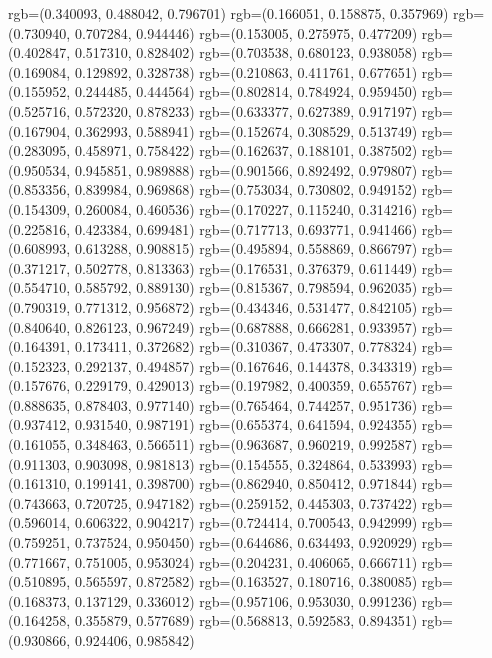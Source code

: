 {{{					rgb=(0.340093, 0.488042, 0.796701)
					rgb=(0.166051, 0.158875, 0.357969)
					rgb=(0.730940, 0.707284, 0.944446)
					rgb=(0.153005, 0.275975, 0.477209)
					rgb=(0.402847, 0.517310, 0.828402)
					rgb=(0.703538, 0.680123, 0.938058)
					rgb=(0.169084, 0.129892, 0.328738)
					rgb=(0.210863, 0.411761, 0.677651)
					rgb=(0.155952, 0.244485, 0.444564)
					rgb=(0.802814, 0.784924, 0.959450)
					rgb=(0.525716, 0.572320, 0.878233)
					rgb=(0.633377, 0.627389, 0.917197)
					rgb=(0.167904, 0.362993, 0.588941)
					rgb=(0.152674, 0.308529, 0.513749)
					rgb=(0.283095, 0.458971, 0.758422)
					rgb=(0.162637, 0.188101, 0.387502)
					rgb=(0.950534, 0.945851, 0.989888)
					rgb=(0.901566, 0.892492, 0.979807)
					rgb=(0.853356, 0.839984, 0.969868)
					rgb=(0.753034, 0.730802, 0.949152)
					rgb=(0.154309, 0.260084, 0.460536)
					rgb=(0.170227, 0.115240, 0.314216)
					rgb=(0.225816, 0.423384, 0.699481)
					rgb=(0.717713, 0.693771, 0.941466)
					rgb=(0.608993, 0.613288, 0.908815)
					rgb=(0.495894, 0.558869, 0.866797)
					rgb=(0.371217, 0.502778, 0.813363)
					rgb=(0.176531, 0.376379, 0.611449)
					rgb=(0.554710, 0.585792, 0.889130)
					rgb=(0.815367, 0.798594, 0.962035)
					rgb=(0.790319, 0.771312, 0.956872)
					rgb=(0.434346, 0.531477, 0.842105)
					rgb=(0.840640, 0.826123, 0.967249)
					rgb=(0.687888, 0.666281, 0.933957)
					rgb=(0.164391, 0.173411, 0.372682)
					rgb=(0.310367, 0.473307, 0.778324)
					rgb=(0.152323, 0.292137, 0.494857)
					rgb=(0.167646, 0.144378, 0.343319)
					rgb=(0.157676, 0.229179, 0.429013)
					rgb=(0.197982, 0.400359, 0.655767)
					rgb=(0.888635, 0.878403, 0.977140)
					rgb=(0.765464, 0.744257, 0.951736)
					rgb=(0.937412, 0.931540, 0.987191)
					rgb=(0.655374, 0.641594, 0.924355)
					rgb=(0.161055, 0.348463, 0.566511)
					rgb=(0.963687, 0.960219, 0.992587)
					rgb=(0.911303, 0.903098, 0.981813)
					rgb=(0.154555, 0.324864, 0.533993)
					rgb=(0.161310, 0.199141, 0.398700)
					rgb=(0.862940, 0.850412, 0.971844)
					rgb=(0.743663, 0.720725, 0.947182)
					rgb=(0.259152, 0.445303, 0.737422)
					rgb=(0.596014, 0.606322, 0.904217)
					rgb=(0.724414, 0.700543, 0.942999)
					rgb=(0.759251, 0.737524, 0.950450)
					rgb=(0.644686, 0.634493, 0.920929)
					rgb=(0.771667, 0.751005, 0.953024)
					rgb=(0.204231, 0.406065, 0.666711)
					rgb=(0.510895, 0.565597, 0.872582)
					rgb=(0.163527, 0.180716, 0.380085)
					rgb=(0.168373, 0.137129, 0.336012)
					rgb=(0.957106, 0.953030, 0.991236)
					rgb=(0.164258, 0.355879, 0.577689)
					rgb=(0.568813, 0.592583, 0.894351)
					rgb=(0.930866, 0.924406, 0.985842)
}}}
